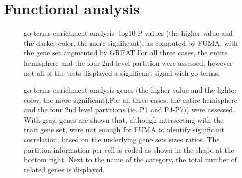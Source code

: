 \chapter{Functional analysis}
\begin{figure}[H]
	\centering
	\quad
	\quad
	\caption[GO terms GSEA -log10P values]{\Ac{go} terms enrichment analysis -log10 P-values (the higher value and the darker color, the more significant), as computed by FUMA, with the gene set augmented by GREAT.For all three cases, the entire hemisphere and the four 2nd level partition were assessed, however not all of the tests displayed a significant signal with \ac{go} terms.}
	\label{fig:go}
\end{figure}
\begin{figure}[H]
	\centering
	\quad
	\quad
	\par\medskip
	\raggedleft
	
	\caption[GO terms GSEA genes]{\Ac{go} terms enrichment analysis genes (the higher value and the lighter color, the more significant).For all three cases, the entire hemisphere and the four 2nd level partitions (ie. P1 and P4-P7)) were assessed. With gray, genes are shown that, although intersecting with the trait gene set, were not enough for FUMA to identify significant correlation, based on the underlying gene sets sizes ratios. The partition information per cell is coded as shown in the shape at the bottom right. Next to the name of the category, the total number of related genes is displayed.}
	\label{fig:go_genes}
\end{figure}
